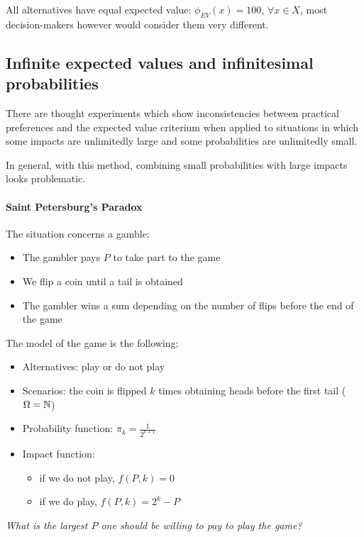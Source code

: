 All alternatives have equal expected value: $\phi_{EV} (x) = 100$, $\forall x \in X$, most decision-makers however would consider them very different.

\subsection{Infinite expected values and infinitesimal probabilities}

There are thought experiments which show inconsistencies between practical preferences and the expected value criterium when applied to situations in which some impacts are unlimitedly large and some probabilities are unlimitedly small. 

In general, with this method, combining small probabilities with large impacts looks problematic.

\paragraph{Saint Petersburg's Paradox} The situation concerns a gamble:
\begin{itemize}
	\item The gambler pays $P$ to take part to the game
	
	\item We flip a coin until a tail is obtained
	
	\item The gambler wins a sum depending on the number of flips before the end of the game
\end{itemize}

The model of the game is the following;
\begin{itemize}
	\item Alternatives: play or do not play
	
	\item Scenarios: the coin is flipped $k$ times obtaining heads before the first tail ($\Omega = \operatorname{\mathbb{N}}$)
	
	\item Probability function: $\pi_k = \frac{1}{2^{k+1}}$
	
	\item Impact function: 
	\begin{itemize}
		\item if we do not play, $f(P, k) = 0$
		
		\item if we do play, $f(P,k) = 2^k - P$
	\end{itemize}
\end{itemize}
\textit{What is the largest $P$  one should be willing to pay to play the game?}

